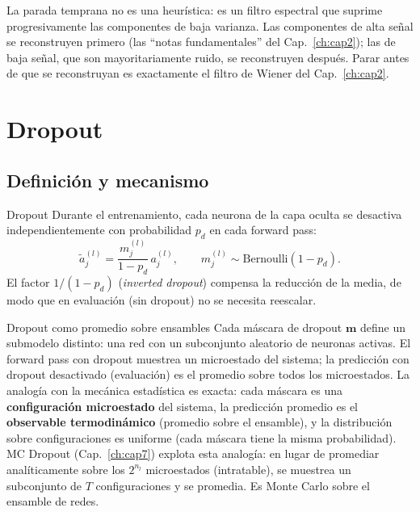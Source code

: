 La parada temprana no es una heurística: es un filtro espectral que
suprime progresivamente las componentes de baja varianza. Las
componentes de alta señal se reconstruyen primero (las ``notas
fundamentales'' del Cap.~\ref{ch:cap2}); las de baja señal, que son
mayoritariamente ruido, se reconstruyen después. Parar antes de que se
reconstruyan es exactamente el filtro de Wiener del Cap.~\ref{ch:cap2}.

\section{Dropout}
\label{sec:dropout}


\subsection{Definición y mecanismo}
\label{subsec:dropout_def}

\begin{definicion}{Dropout}
\label{def:dropout}
Durante el entrenamiento, cada neurona de la capa oculta se desactiva
independientemente con probabilidad $p_d$ en cada forward pass:
\begin{equation}
  \tilde{a}_j^{(l)} = \frac{m_j^{(l)}}{1-p_d}\,a_j^{(l)},
  \qquad m_j^{(l)} \sim \text{Bernoulli}(1-p_d).
  \label{eq:dropout}
\end{equation}
El factor $1/(1-p_d)$ (\textit{inverted dropout}) compensa la
reducción de la media, de modo que en evaluación (sin dropout) no se
necesita reescalar.
\end{definicion}

\begin{fisicaconexion}{Dropout como promedio sobre ensambles}
\label{fc:dropout_ensemble}
Cada máscara de dropout $\bm{m}$ define un submodelo distinto: una red
con un subconjunto aleatorio de neuronas activas. El forward pass con
dropout muestrea un microestado del sistema; la predicción con dropout
desactivado (evaluación) es el promedio sobre todos los microestados.
La analogía con la mecánica estadística es exacta: cada máscara es una
\textbf{configuración microestado} del sistema, la predicción promedio
es el \textbf{observable termodinámico} (promedio sobre el ensamble),
y la distribución sobre configuraciones es uniforme (cada máscara tiene
la misma probabilidad). MC Dropout (Cap.~\ref{ch:cap7}) explota esta
analogía: en lugar de promediar analíticamente sobre los $2^{n_l}$
microestados (intratable), se muestrea un subconjunto de $T$
configuraciones y se promedia. Es Monte Carlo sobre el ensamble de
redes.
\end{fisicaconexion}

